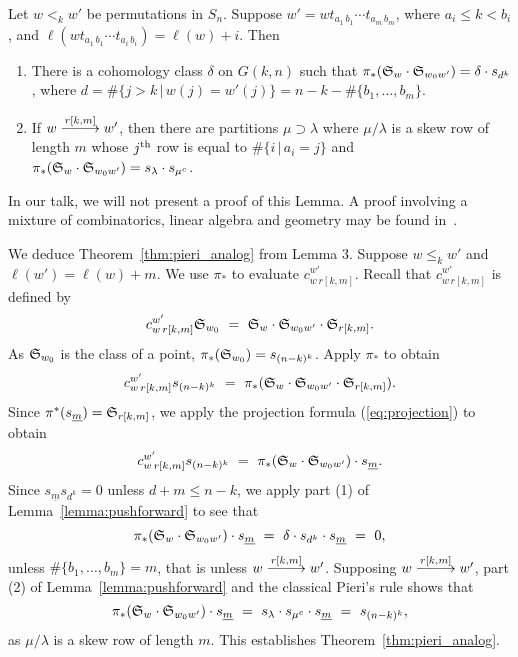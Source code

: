 \begin{lemma}\label{lemma:pushforward}
 Let $w<_k w'$ be permutations in $S_n$.
Suppose  $w' = w t_{a_1\,b_1}\cdots t_{a_m\,b_m}$,
where $a_i\leq k<b_i$, and 
$\ell(w t_{a_1\,b_1}\cdots t_{a_i\,b_i}) = \ell(w)+i$.
Then
\begin{enumerate}
\item There is a cohomology class $\delta$ on $G(k,n)$
such that
$\pi_*({\frak S}_w\cdot {\frak S}_{w_0w'}) = \delta \cdot s_{d^k}$,
where $d = \#\{j>k\,|\, w(j) = w'(j)\} = 
n-k-\#\{b_1,\ldots,b_m\}$.
\smallskip
\item If $w\rkm w'$, then there are partitions 
$\mu \supset \lambda$ where $\mu/\lambda$ is a skew row of length $m$
whose $j^{\mbox{\scriptsize th}}$ row 
is equal to $\#\{i\,|\, a_i = j\}$
and
$\pi_*({\frak S}_w\cdot {\frak S}_{w_0w'}) = s_{\lambda}\cdot s_{\mu^c}$.
\end{enumerate}
\end{lemma}

In our talk, we will not present a proof of this Lemma.
A proof involving a mixture of 
combinatorics, linear algebra and geometry may be found 
in~\cite{sottile_Pieri_flag}.

We deduce Theorem~\ref{thm:pieri_analog} from Lemma 3.
Suppose $w\leq_k w'$ and $\ell(w') = \ell(w) +m$.
We use $\pi_*$  to evaluate $c^{w'}_{w\,r[k,m]}$.
Recall that $ c^{w'}_{w \,r[k,m]}$ is defined by 
$$
 c^{w'}_{w \,r[k,m]} {\frak S}_{w_0}
\ = \ 
{\frak S}_w\cdot {\frak S}_{w_0w'} \cdot {\frak S}_{r[k,m]}.
$$
As  ${\frak S}_{w_0}$ is the class of a point, 
$\pi_*({\frak S}_{w_0})= s_{(n-k)^k}$. 
Apply $\pi_*$ to obtain
$$
 c^{w'}_{w \,r[k,m]} s_{(n-k)^k} 
\ =\ 
\pi_*({\frak S}_w\cdot {\frak S}_{w_0w'} \cdot {\frak S}_{r[k,m]}).
$$
Since  $\pi^*(s_{\underline{m}}) = {\frak S}_{r[k,m]}$,
we apply the projection formula (\ref{eq:projection}) to obtain
$$
c^{w'}_{w \,r[k,m]} s_{(n-k)^k} \ = \ 
\pi_*({\frak S}_w\cdot {\frak S}_{w_0w'}) \cdot s_{\underline{m}}.
$$
Since $s_{\underline{m}}  s_{d^k} = 0$ unless $d+m \leq n-k$, we 
apply part (1) of Lemma~\ref{lemma:pushforward} to see that 
$$
\pi_*({\frak S}_w\cdot {\frak S}_{w_0w'}) \cdot s_{\underline{m}}
\  =\   \delta \cdot s_{d^k}\cdot s_{\underline{m}}\   =\   0,
$$
unless $\#\{b_1,\ldots,b_m\} = m$, that is unless
$w\rkm w'$.
Supposing $w\rkm w'$, part (2) of  Lemma~\ref{lemma:pushforward}
and the classical Pieri's rule shows that 
$$
\pi_*({\frak S}_w\cdot {\frak S}_{w_0w'}) \cdot s_{\underline{m}}
\  =\   s_{\lambda}\cdot s_{\mu^c}\cdot s_{\underline{m}}\   =
\   s_{(n-k)^k},
$$
as $\mu/\lambda$ is a skew row of length $m$.
This establishes Theorem~\ref{thm:pieri_analog}.


